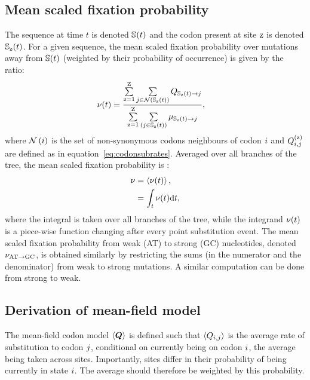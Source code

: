 \documentclass{article}
\begin{document}
\subsection{Mean scaled fixation probability}
\label{subsec:fixation-bias}
The sequence at time $t$ is denoted $\mathbb{S}(t)$ and the codon present at site $\text{z}$ is denoted $\mathbb{S}_{\text{z}}(t)$.
For a given sequence, the mean scaled fixation probability over mutations away from $\mathbb{S}(t)$ (weighted by their probability of occurrence) is given by the ratio:
\begin{align}
    \nu (t) & = \dfrac{ \sum\limits_{\text{z}=1}^{\text{Z}} \sum\limits_{{j} \in \mathcal{N} \left ( \mathbb{S}_{\text{z}}(t) \right)} Q_{\mathbb{S}_{\text{z}}(t) \to {j}}}{ \sum\limits_{\text{z}=1}^{\text{Z}} \sum\limits_{\left ( {j} \in \mathbb{S}_{\text{z}}(t) \right)} \mu_{\mathbb{S}_{\text{z}}(t) \to {j}}},
\end{align}
where $\mathcal{N}\left({i}\right)$ is the set of {non-synonymous} codons neighbours of codon ${i}$ and $Q_{{i}, {j}}^{(\text{z})}$ are defined as in equation~\ref{eq:codonsubrates}.
Averaged over all branches of the tree, the mean scaled fixation probability is :
\begin{align}
    \nu & = \left\langle \nu (t) \right\rangle, \\
    & = \int_{t} \nu (t) \mathrm{d} t,
\end{align}
where the integral is taken over all branches of the tree, while the integrand $\nu (t)$ is a piece-wise function changing after every point {substitution} event.
The mean scaled fixation probability from weak (AT) to strong (GC) nucleotides, denoted $\nu_{\text{AT} \rightarrow \text{GC}}$, is obtained similarly by restricting the sums (in the numerator and the denominator) from weak to strong mutations.
A similar computation can be done from strong to weak.

\subsection{Derivation of mean-field model}
\label{subsec:mean-field-derivation}
The mean-field codon model $\left\langle \bm{Q} \right\rangle$ is defined such that $\left\langle Q_{{i}, {j}} \right\rangle$ is the average rate of {substitution} to codon ${j}$, conditional on currently being on codon ${i}$, the average being taken across sites.
Importantly, sites differ in their probability of being currently in state ${i}$.
The average should therefore be weighted by this probability.
\end{document}
